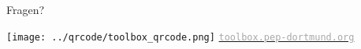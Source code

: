 \begin{frame}
  \begin{minipage}{.5\textwidth}
    \Huge\centering
    \textcolor{red!70!black}{Fragen?}
  \end{minipage}
  \begin{minipage}{.49\textwidth}
    \centering
    \texttt{[image: ../qrcode/toolbox\_qrcode.png]}
    \Large
    \href{https://toolbox.pep-dortmund.org}{\textcolor{darkgray}{\texttt{toolbox.pep-dortmund.org}}}
  \end{minipage}
\end{frame}

